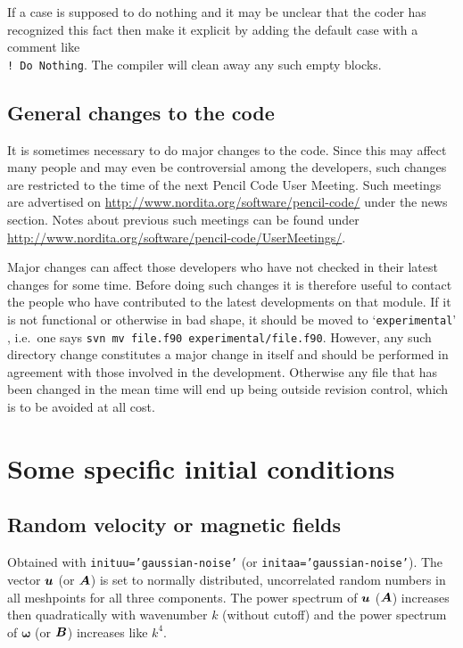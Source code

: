 \documentclass[\mydriver,12pt,twoside,notitlepage,a4paper]{article}
\makeatletter
\newcommand{\code}[1]{\texttt{#1}}
\newcommand{\file}[2][]{%
  \def\index@{#1}%
  `\texttt{#2}'%
  \ifx\index@\@empty\index[file]{#2@\texttt{#2}}%
  \else\index[file]{#1@\texttt{#1}}%
  \fi%
}
\renewcommand{\vec}[1]{\mbox{\boldmath{$#1$}}}
\newcommand{\Av}            {\vec{A}}
\newcommand{\Bv}            {\vec{B}}
\newcommand{\uv}            {\vec{u}}
\newcommand{\omv}           {\boldsymbol{\omega}}
\makeatother
\begin{document}
If a case is supposed to do nothing and it may be unclear that the
coder has recognized this fact then make it explicit by adding the
default case with a comment like\\
\code{! Do Nothing}.
The compiler will clean away any such empty blocks.

\subsection{General changes to the code}

It is sometimes necessary to do major changes to the code.
Since this may affect many people and may even be controversial
among the developers, such changes are restricted to the time
of the next Pencil Code User Meeting.
Such meetings are advertised on \url{http://www.nordita.org/software/pencil-code/}
under the news section.
Notes about previous such meetings can be found under
\url{http://www.nordita.org/software/pencil-code/UserMeetings/}.

Major changes can affect those developers who have not checked in
their latest changes for some time.
Before doing such changes it is therefore useful to contact the people
who have contributed to the latest developments on that module.
If it is not functional or otherwise in bad shape, it should be
moved to \file{experimental}, i.e.\ one says
\code{svn mv file.f90 experimental/file.f90}.
However, any such directory change constitutes a major change in
itself and should be performed in agreement with those involved in
the development.
Otherwise any file that has been changed in the mean time will end up
being outside revision control, which is to be avoided at all cost.


\section{Some specific initial conditions}

\subsection{Random velocity or magnetic fields}

Obtained with \code{inituu='gaussian-noise'}
(or \code{initaa='gaussian-noise'}).
The vector $\uv$ (or $\Av$) is set to normally distributed, uncorrelated random
numbers in all meshpoints for all three components.
The power spectrum of
$\uv$ ($\Av$) increases then quadratically with wavenumber $k$ (without cutoff)
and the power spectrum of $\omv$ (or $\Bv$) increases like $k^4$.
\end{document}
